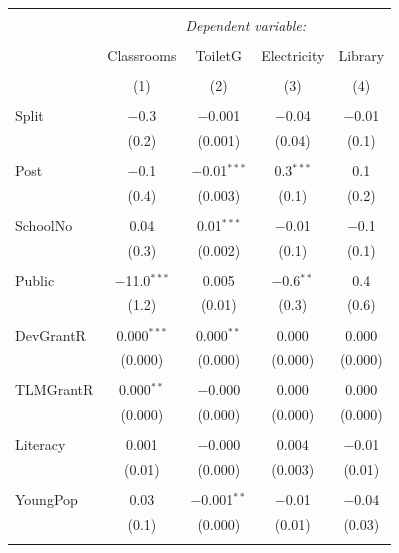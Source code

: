 \documentclass[12pt, a4paper]{article}
\begin{document}
\begin{table}[!htbp] \centering 
  \caption{} 
  \label{} 
\begin{tabular}{@{\extracolsep{5pt}}lcccc} 
\\[-1.8ex]\hline 
\hline \\[-1.8ex] 
 & \multicolumn{4}{c}{\textit{Dependent variable:}} \\ 
\cline{2-5} 
\\[-1.8ex] & Classrooms & ToiletG & Electricity & Library \\ 
\\[-1.8ex] & (1) & (2) & (3) & (4)\\ 
\hline \\[-1.8ex] 
 Split & $-$0.3 & $-$0.001 & $-$0.04 & $-$0.01 \\ 
  & (0.2) & (0.001) & (0.04) & (0.1) \\ 
  & & & & \\ 
 Post & $-$0.1 & $-$0.01$^{***}$ & 0.3$^{***}$ & 0.1 \\ 
  & (0.4) & (0.003) & (0.1) & (0.2) \\ 
  & & & & \\ 
 SchoolNo & 0.04 & 0.01$^{***}$ & $-$0.01 & $-$0.1 \\ 
  & (0.3) & (0.002) & (0.1) & (0.1) \\ 
  & & & & \\ 
 Public & $-$11.0$^{***}$ & 0.005 & $-$0.6$^{**}$ & 0.4 \\ 
  & (1.2) & (0.01) & (0.3) & (0.6) \\ 
  & & & & \\ 
 DevGrantR & 0.000$^{***}$ & 0.000$^{**}$ & 0.000 & 0.000 \\ 
  & (0.000) & (0.000) & (0.000) & (0.000) \\ 
  & & & & \\ 
 TLMGrantR & 0.000$^{**}$ & $-$0.000 & 0.000 & 0.000 \\ 
  & (0.000) & (0.000) & (0.000) & (0.000) \\ 
  & & & & \\ 
 Literacy & 0.001 & $-$0.000 & 0.004 & $-$0.01 \\ 
  & (0.01) & (0.000) & (0.003) & (0.01) \\ 
  & & & & \\ 
 YoungPop & 0.03 & $-$0.001$^{**}$ & $-$0.01 & $-$0.04 \\ 
  & (0.1) & (0.000) & (0.01) & (0.03) \\ 
  & & & & \\ 

\end{tabular}
\end{table}
\end{document}
